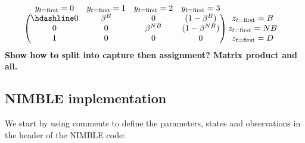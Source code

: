 \documentclass[
  12pt,
]{krantz}
\begin{document}
\[
\begin{matrix}
& \\
    \left ( \vphantom{ \begin{matrix} 12 \\ 12 \\ 12\end{matrix} } \right .
\end{matrix}
\hspace{-1.2em}
\begin{matrix}
    y_{t = \text{first}}=0 & y_{t = \text{first}}=1 & y_{t = \text{first}}=2 & y_{t = \text{first}}=3\\ \hdashline
 0 & \beta^B & 0 & (1-\beta^B)\\
0 & 0 & \beta^{NB} & (1-\beta^{NB})\\
1 & 0 & 0 & 0
\end{matrix}
\hspace{-0.2em}
\begin{matrix}
& \\
\left . \vphantom{ \begin{matrix} 12 \\ 12 \\ 12\end{matrix} } \right )
    \begin{matrix}
    z_{t = \text{first}}=B \\ z_{t = \text{first}}=NB \\ z_{t = \text{first}}=D
    \end{matrix}
\end{matrix}
\]
\textbf{Show how to split into capture then assignment? Matrix product and all.}

\hypertarget{nimble-implementation-4}{%
\subsection{NIMBLE implementation}\label{nimble-implementation-4}}

We start by using comments to define the parameters, states and observations in the header of the NIMBLE code:
\end{document}
